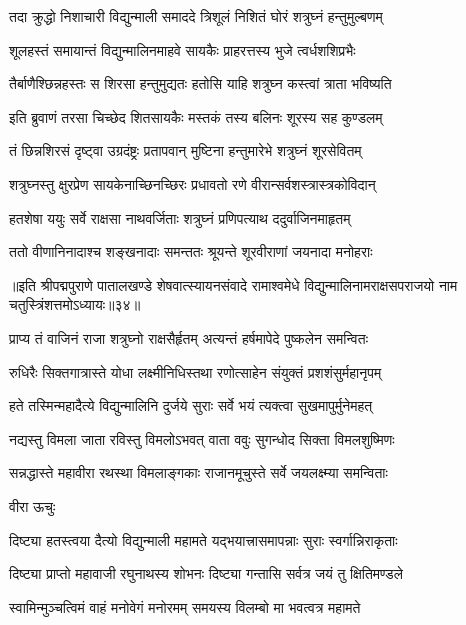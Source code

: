 \twolineshloka
{तदा क्रुद्धो निशाचारी विद्युन्माली समाददे}
{त्रिशूलं निशितं घोरं शत्रुघ्नं हन्तुमुल्बणम्}%

\twolineshloka
{शूलहस्तं समायान्तं विद्युन्मालिनमाहवे}
{सायकैः प्राहरत्तस्य भुजे त्वर्धशशिप्रभैः}%

\twolineshloka
{तैर्बाणैश्छिन्नहस्तः स शिरसा हन्तुमुद्यतः}
{हतोसि याहि शत्रुघ्न कस्त्वां त्राता भविष्यति}%

\twolineshloka
{इति ब्रुवाणं तरसा चिच्छेद शितसायकैः}
{मस्तकं तस्य बलिनः शूरस्य सह कुण्डलम्}%

\twolineshloka
{तं छिन्नशिरसं दृष्ट्वा उग्रदंष्ट्रः प्रतापवान्}
{मुष्टिना हन्तुमारेभे शत्रुघ्नं शूरसेवितम्}%

\twolineshloka
{शत्रुघ्नस्तु क्षुरप्रेण सायकेनाच्छिनच्छिरः}
{प्रधावतो रणे वीरान्सर्वशस्त्रास्त्रकोविदान्}%

\twolineshloka
{हतशेषा ययुः सर्वे राक्षसा नाथवर्जिताः}
{शत्रुघ्नं प्रणिपत्याथ ददुर्वाजिनमाहृतम्}%

\twolineshloka
{ततो वीणानिनादाश्च शङ्खनादाः समन्ततः}
{श्रूयन्ते शूरवीराणां जयनादा मनोहराः}%

॥इति श्रीपद्मपुराणे पातालखण्डे शेषवात्स्यायनसंवादे रामाश्वमेधे विद्युन्मालिनामराक्षसपराजयो नाम चतुस्त्रिंशत्तमोऽध्यायः॥३४॥



\twolineshloka
{प्राप्य तं वाजिनं राजा शत्रुघ्नो राक्षसैर्हृतम्}
{अत्यन्तं हर्षमापेदे पुष्कलेन समन्वितः}%

\twolineshloka
{रुधिरैः सिक्तगात्रास्ते योधा लक्ष्मीनिधिस्तथा}
{रणोत्साहेन संयुक्तं प्रशशंसुर्महानृपम्}%

\twolineshloka
{हते तस्मिन्महादैत्ये विद्युन्मालिनि दुर्जये}
{सुराः सर्वे भयं त्यक्त्वा सुखमापुर्मुनेमहत्}%

\twolineshloka
{नद्यस्तु विमला जाता रविस्तु विमलोऽभवत्}
{वाता ववुः सुगन्धोद सिक्ता विमलशुष्मिणः}%

\twolineshloka
{सन्नद्धास्ते महावीरा रथस्था विमलाङ्गकाः}
{राजानमूचुस्ते सर्वे जयलक्ष्म्या समन्विताः}%

वीरा ऊचुः

\twolineshloka
{दिष्ट्या हतस्त्वया दैत्यो विद्युन्माली महामते}
{यद्भयात्त्रासमापन्नाः सुराः स्वर्गान्निराकृताः}%

\twolineshloka
{दिष्ट्या प्राप्तो महावाजी रघुनाथस्य शोभनः}
{दिष्ट्या गन्तासि सर्वत्र जयं तु क्षितिमण्डले}%

\twolineshloka
{स्वामिन्मुञ्चत्विमं वाहं मनोवेगं मनोरमम्}
{समयस्य विलम्बो मा भवत्वत्र महामते}%


